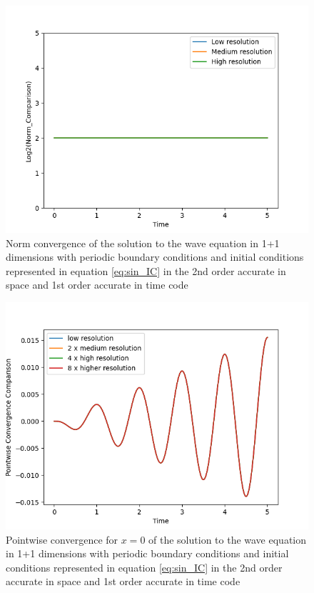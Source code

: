 \begin{figure}[t!]
    \centering
    \includegraphics[width=\columnwidth]{Images/simple_wave-2nd-norm.png}
    \caption{Norm convergence of the solution to the wave equation in 1+1 dimensions with periodic boundary conditions and initial conditions represented in equation \eqref{eq:sin_IC} in the 2nd order accurate in space and 1st order accurate in time code}
    \label{fig:norm_simple_wave_2nd_order}
\end{figure}

\begin{figure}[t!]
    \centering
    \includegraphics[width=\columnwidth]{Images/simple_wave-2nd-point.png}
    \caption{Pointwise convergence for $x = 0$ of the solution to the wave equation in 1+1 dimensions with periodic boundary conditions and initial conditions represented in equation \eqref{eq:sin_IC} in the 2nd order accurate in space and 1st order accurate in time code}
    \label{fig:point_simple_wave_2nd_order}
\end{figure}

